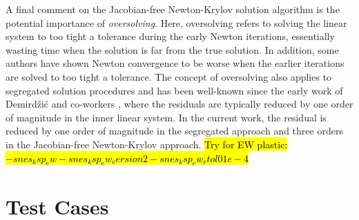 \documentclass[sn-mathphys,Numbered]{sn-jnl}%
\begin{document}
A final comment on the Jacobian-free Newton-Krylov solution algorithm is the potential importance of \emph{oversolving}.
Here, oversolving refers to solving the linear system to too tight a tolerance during the early Newton iterations, essentially wasting time when the solution is far from the true solution.
In addition, some authors %
\cite{Knoll2004} have shown Newton convergence to be worse when the earlier iterations are solved to too tight a tolerance.
The concept of oversolving also applies to segregated solution procedures and has been well-known since the early work of Demird\v{z}i\'{c} and co-workers \cite{Demirdzic1995}, where the residuals are typically reduced by one order of magnitude in the inner linear system.
In the current work, the residual is reduced by one order of magnitude in the segregated approach and three orders in the Jacobian-free Newton-Krylov approach.
\hl{Try for EW plastic: $-snes_ksp_ew -snes_ksp_ew_version 2 -snes_ksp_ew_rtol0 1e-4$}





\section{Test Cases}\label{sec:test_cases}

\end{document}
